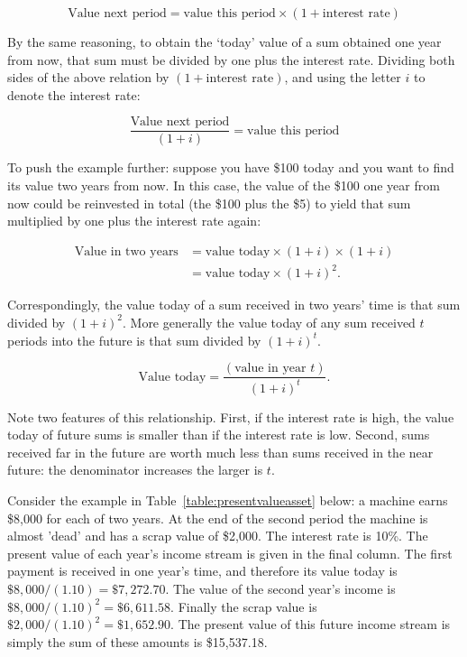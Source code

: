 \begin{equation*}
\text{Value next period}=\text{value this period}\times(1+\text{interest rate})
\end{equation*}

By the same reasoning, to obtain the `today' value of a sum obtained one year from now, that sum must be divided by one plus the interest rate. Dividing both sides of the above relation by $(1+\text{interest rate})$, and using the letter $i$ to denote the interest rate: 

\begin{equation*}
\frac{\text{Value next period}}{(1+i)}=\text{value this period}
\end{equation*}

To push the example further: suppose you have \$100 today and you want to find its value two years from now. In this case, the value of the \$100 one year from now could be reinvested in total (the \$100 plus the \$5) to yield that sum multiplied by one plus the interest rate again:

\begin{align*}
\text{Value in two years}&=\text{value today}\times(1+i)\times(1+i)	\\
&=\text{value today}\times(1+i)^2.
\end{align*}

Correspondingly, the value today of a sum received in two years' time is that sum divided by $(1+i)^2$. More generally the value today of any sum received $t$ periods into the future is that sum divided by $(1+i)^t$.

\begin{equation*}
\text{Value today}=\frac{(\text{value in year }t)}{(1 + i)^t}.
\end{equation*}

Note two features of this relationship. First, if the interest rate is high, the value today of future sums is smaller than if the interest rate is low. Second, sums received far in the future are worth much less than sums received in the near future: the denominator increases the larger is $t$.

Consider the example in Table~\ref{table:presentvalueasset} below: a machine earns \$8,000 for each of two years. At the end of the second period the machine is almost 'dead' and has a scrap value of \$2,000. The interest rate is 10\%. The present value of each year's income stream is given in the final column. The first payment is received in one year's time, and therefore its value today is $\$8,000/(1.10)=\$7,272.70$. The value of the second year's income is $\$8,000/(1.10)^2=\$6,611.58$.  Finally the scrap value is $\$2,000/(1.10)^2=\$1,652.90$. The present value of this future income stream is simply the sum of these amounts is \$15,537.18.

